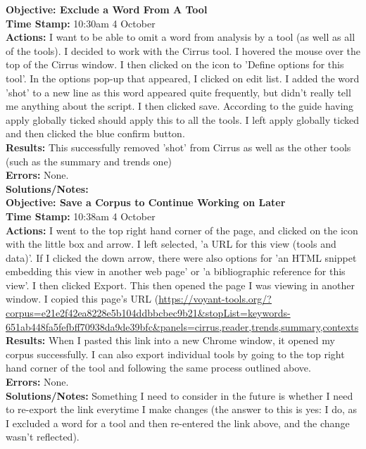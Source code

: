 \documentclass{article}
\begin{document}
\begin{FlushLeft}
\vspace{5mm}
\textbf{Objective: Exclude a Word From A Tool}\\ 
\textbf{Time Stamp:} 10:30am 4 October\\
\textbf{Actions:} I want to be able to omit a word from analysis by a tool (as well as all of the tools). I decided to work with the Cirrus tool. I hovered the mouse over the top of the Cirrus window. I then clicked on the icon to 'Define options for this tool'. In the options pop-up that appeared, I clicked on edit list. I added the word 'shot' to a new line as this word appeared quite frequently, but didn't really tell me anything about the script. I then clicked save. According to the guide having apply globally ticked should apply this to all the tools. I left apply globally ticked and then clicked the blue confirm button.\\
\textbf{Results:} This successfully removed 'shot' from Cirrus as well as the other tools (such as the summary and trends one)\\
\textbf{Errors:} None.\\
\textbf{Solutions/Notes:}\\
\vspace{5mm}
\textbf{Objective: Save a Corpus to Continue Working on Later}\\ 
\textbf{Time Stamp:} 10:38am 4 October\\
\textbf{Actions:} I went to the top right hand corner of the page, and clicked on the icon with the little box and arrow. I left selected, 'a URL for this view (tools and data)'. If I clicked the down arrow, there were also options for 'an HTML snippet embedding this view in another web page' or 'a bibliographic reference for this view'. I then clicked Export. This then opened the page I was viewing in another window. I copied this page's URL (\url{https://voyant-tools.org/?corpus=e21e2f42ea8228e5b104ddbbcbec9b21&stopList=keywords-651ab448fa5fefbff70938da9de39bfc&panels=cirrus,reader,trends,summary,contexts}\\
\textbf{Results:} When I pasted this link into a new Chrome window, it opened my corpus successfully. I can also export individual tools by going to the top right hand corner of the tool and following the same process outlined above.\\
\textbf{Errors:} None.\\
\textbf{Solutions/Notes:} Something I need to consider in the future is whether I need to re-export the link everytime I make changes (the answer to this is yes: I do, as I excluded a word for a tool and then re-entered the link above, and the change wasn't reflected).\\


\end{FlushLeft}
\end{document}
